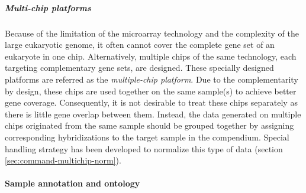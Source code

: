 

\subparagraph{Multi-chip platforms}\label{sec:command-multichip-anno}
Because of the limitation of the microarray technology and the complexity of
the large eukaryotic genome, it often cannot cover the complete gene set of an
eukaryote in one chip.
%
Alternatively, multiple chips of the same technology, each targeting
complementary gene sets, are designed.
%
These specially designed platforms are referred as the \textit{multiple-chip
  platform}.
%
Due to the complementarity by design, these chips are used together on the
same sample(s) to achieve better gene coverage.
%
Consequently, it is not desirable to treat these chips separately as there is
little gene overlap between them.
%
Instead, the data generated on multiple chips originated from the same sample
should be grouped together by assigning corresponding hybridizations to the
target sample in the compendium.
%
Special handling strategy has been developed to normalize this type of data
(section \ref{sec:command-multichip-norm}).






\paragraph{Sample annotation and ontology}

